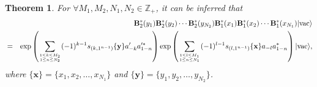 \documentclass[11pt,reqno]{amsart}
\numberwithin{equation}{section}
\newtheorem{theorem}{Theorem}[section]
\begin{document}
\begin{theorem}
For $\forall M_{1}, M_{2},N_{1}, N_{2}\in\mathbb{Z}_{+}$, it can be inferred that
\begin{eqnarray}\label{B_1_N}
&&\mathbf{B}^{\ast}_{2}(y_{1})\mathbf{B}^{\ast}_{2}(y_{2})\cdots
\mathbf{B}^{\ast}_{2}(y_{N_{2}})\mathbf{B}^{\ast}_{1}(x_{1})
\mathbf{B}^{\ast}_{1}(x_{2})\cdots\mathbf{B}^{\ast}_{1}(x_{N_{1}})|\text{vac}\rangle\notag\\
&=&\exp\left(\sum\limits_{1\leq k\leq M_{2}\atop{1\leq n\leq N_{2}}}(-1)^{k-1}s_{(k,1^{n-1})}\{\mathbf{y}\}a^{\prime}_{-k}a^{\prime\ast}_{1-n}\right)
\exp\left(\sum\limits_{1\leq l\leq M_{1}\atop{1\leq n\leq N_{1}}}(-1)^{l-1}s_{(l,1^{n-1})}\{\mathbf{x}\}a_{-l}a^{\ast}_{1-n}\right)|\text{vac}\rangle,
\notag\\
\end{eqnarray}
where $\{\mathbf{x}\}=\{x_{1},x_{2},\ldots,x_{N_{1}}\}$ and $\{\mathbf{y}\}=\{y_{1},y_{2},\ldots,y_{N_{2}}\}$.
\end{theorem}
\end{document}
